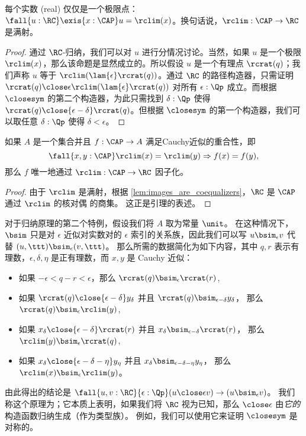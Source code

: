 \begin{lem} \label{RC-lim-onto}
每个实数 (real) 仅仅是一个极限点：$\fall{u : \RC} \exis{x : \CAP} u = \rclim(x)$。换句话说，$\rclim:\CAP\to\RC$ 是满射。
\end{lem}
\begin{proof}
  通过 $\RC$-归纳，我们可以对 $u$ 进行分情况讨论。当然，如果 $u$ 是一个极限 $\rclim(x)$，那么该命题是显然成立的。所以假设 $u$ 是一个有理点 $\rcrat(q)$；我们声称 $u$ 等于 $\rclim(\lam{\epsilon} \rcrat(q))$。通过 $\RC$ 的路径构造器，只需证明 $\rcrat(q) \close\epsilon \rclim(\lam{\epsilon} \rcrat(q))$ 对所有 $\epsilon:\Qp$ 成立。而根据 $\closesym$ 的第二个构造器，为此只需找到 $\delta:\Qp$ 使得 $\rcrat(q)\close{\epsilon-\delta} \rcrat(q)$。但根据 $\closesym$ 的第一个构造器，我们可以取任意 $\delta:\Qp$ 使得 $\delta<\epsilon$。
\end{proof}


%

\begin{lem} \label{RC-lim-factor}
如果 $A$ 是一个集合并且 $f : \CAP \to A$ 满足Cauchy近似的重合性，即
%
\begin{equation*}
  \fall{x, y : \CAP} \rclim(x) = \rclim(y) \Rightarrow f(x) = f(y),
\end{equation*}
%
那么 $f$ 唯一地通过 $\rclim : \CAP \to \RC$ 因子化。
\end{lem}
\begin{proof}
  由于 $\rclim$ 是满射，根据 \cref{lem:images_are_coequalizers}，$\RC$ 是 $\CAP$ 通过 $\rclim$ 的核对偶 的商集。
  这正是引理的表述。
\end{proof}

对于归纳原理的第二个特例，假设我们将 $A$ 取为常量 $\unit$。
在这种情况下，$\bsim$ 只是对 $\epsilon$ 近似对实数对的 $\epsilon$ 索引的关系族，因此我们可以写 $u\bsim_\epsilon v$ 代替 $(u,\ttt)\bsim_\epsilon (v,\ttt)$。
那么所需的数据简化为如下内容，其中 $q, r$ 表示有理数，$\epsilon, \delta, \eta$ 是正有理数，而 $x, y$ 是 Cauchy 近似：
\begin{itemize}
  \item 如果 $-\epsilon < q - r < \epsilon$，那么
  $\rcrat(q) \bsim_\epsilon \rcrat(r)$,
  \item 如果 $\rcrat(q) \close{\epsilon - \delta} y_\delta$ 并且
  $\rcrat(q)\bsim_{\epsilon-\delta} y_\delta$，
  那么 $\rcrat(q) \bsim_\epsilon \rclim(y)$,
  \item 如果 $x_\delta \close{\epsilon - \delta} \rcrat(r)$ 并且
  $x_\delta \bsim_{\epsilon-\delta} \rcrat(r)$，
  那么 $\rclim(y) \bsim_\epsilon \rcrat(q)$,
  \item 如果 $x_\delta \close{\epsilon - \delta - \eta} y_\eta$ 并且
  $x_\delta\bsim_{\epsilon - \delta - \eta} y_\eta$，
  那么 $\rclim(x) \bsim_\epsilon \rclim(y)$。
\end{itemize}
由此得出的结论是 $\fall{u,v:\RC}{\epsilon:\Qp} (u\close\epsilon v) \to (u \bsim_\epsilon v)$。
我们称这个原理为；它本质上表明，如果我们将 $\RC$ 视为已知，那么 $\close\epsilon$ 由\emph{它的}构造函数归纳生成（作为类型族）。
例如，我们可以使用它来证明 $\closesym$ 是对称的。

